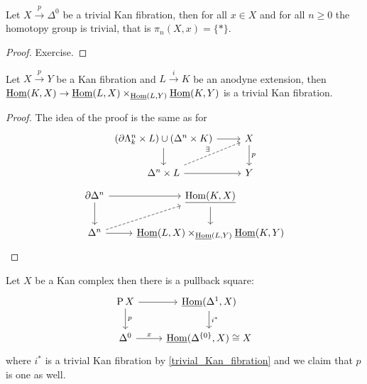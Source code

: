 \begin{prop}
    Let $X \xrightarrow{p} \Delta^0$ be a trivial Kan fibration, then for all $x \in X$ and for all $n\geq 0$ the homotopy group is trivial, that is $\pi_n(X,x)=\{*\}$.
\end{prop}

\begin{proof}
    Exercise.    
\end{proof}

\begin{prop}
    Let $X \xrightarrow{p} Y$ be a Kan fibration and $L \xrightarrow{i}K$ be an anodyne extension, then
    $\underline{\operatorname{Hom}} (K,X) \to \underline{\operatorname{Hom}}(L,X) \times_{\underline{\operatorname{Hom}}(L,Y)} \underline{\operatorname{Hom}} (K,Y) $ is a trivial Kan fibration.    
\end{prop}

\begin{proof}
    The idea of the proof is the same as for 
    \[
    \begin{tikzcd}
        (\partial \Lambda_k^n \times L) \cup (\Delta^n \times K)
        \ar[r]
        \ar[d]
        &
        X
        \ar[d, "p"]
        \\
        \Delta^n \times L 
        \ar[r]
        \ar[ru, dashed, "\exists"]
        &
        Y
    \end{tikzcd}
    \]
    \[
    \begin{tikzcd}
        \partial \Delta^n 
        \ar[r]
        \ar[d]
        &
        \underline{\Hom(K,X)}
        \ar[d]
        \\
        \Delta^n 
        \ar[r]
        \ar[ru, dashed]
        &
        \underline{\Hom}(L,X) \times_{\underline{\Hom}(L,Y)} \underline{\Hom} (K,Y)
    \end{tikzcd}
    \]
\end{proof}

\begin{cor}
    Let $X$ be a Kan complex then there is a pullback square:
    \[
    \begin{tikzcd}
        \Pathspace X
        \ar[r]
        \ar[d, "p"]
        &
        \underline{\Hom}(\Delta^1,X)
        \ar[d, "i^*"]
        \\
        \Delta^0
        \ar[r, "x"]
        &
        \underline{\Hom}(\Delta^{\{0\}},X) \cong X
    \end{tikzcd}
    \]
    where $i^*$ is a trivial Kan fibration by \cref{trivial_Kan_fibration} and we claim that $p$ is one as well.
\end{cor}

